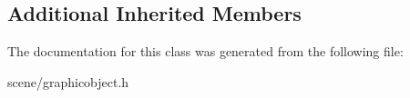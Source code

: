 \subsection*{Additional Inherited Members}


The documentation for this class was generated from the following file\+:\begin{DoxyCompactItemize}
\item 
scene/graphicobject.\+h\end{DoxyCompactItemize}
